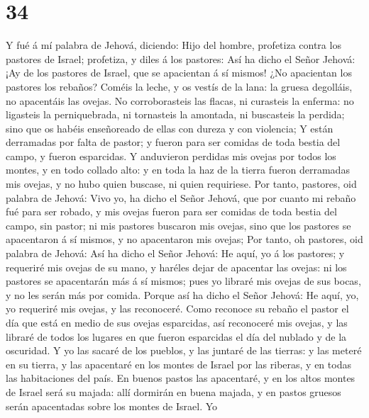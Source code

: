 \hypertarget{section-33}{%
\section{34}\label{section-33}}

 Y fué á mí palabra de Jehová, diciendo: 
Hijo del hombre, profetiza contra los pastores de Israel; profetiza, y
diles á los pastores: Así ha dicho el Señor Jehová: ¡Ay de los pastores
de Israel, que se apacientan á sí mismos! ¿No apacientan los pastores
los rebaños?  Coméis la leche, y os vestís de la lana: la
gruesa degolláis, no apacentáis las ovejas.  No
corroborasteis las flacas, ni curasteis la enferma: no ligasteis la
perniquebrada, ni tornasteis la amontada, ni buscasteis la perdida; sino
que os habéis enseñoreado de ellas con dureza y con violencia;
 Y están derramadas por falta de pastor; y fueron para ser
comidas de toda bestia del campo, y fueron esparcidas.  Y
anduvieron perdidas mis ovejas por todos los montes, y en todo collado
alto: y en toda la haz de la tierra fueron derramadas mis ovejas, y no
hubo quien buscase, ni quien requiriese.  Por tanto,
pastores, oid palabra de Jehová:  Vivo yo, ha dicho el
Señor Jehová, que por cuanto mi rebaño fué para ser robado, y mis ovejas
fueron para ser comidas de toda bestia del campo, sin pastor; ni mis
pastores buscaron mis ovejas, sino que los pastores se apacentaron á sí
mismos, y no apacentaron mis ovejas;  Por tanto, oh
pastores, oid palabra de Jehová:  Así ha dicho el Señor
Jehová: He aquí, yo á los pastores; y requeriré mis ovejas de su mano, y
haréles dejar de apacentar las ovejas: ni los pastores se apacentarán
más á sí mismos; pues yo libraré mis ovejas de sus bocas, y no les serán
más por comida.  Porque así ha dicho el Señor Jehová: He
aquí, yo, yo requeriré mis ovejas, y las reconoceré. 
Como reconoce su rebaño el pastor el día que está en medio de sus ovejas
esparcidas, así reconoceré mis ovejas, y las libraré de todos los
lugares en que fueron esparcidas el día del nublado y de la oscuridad.
 Y yo las sacaré de los pueblos, y las juntaré de las
tierras: y las meteré en su tierra, y las apacentaré en los montes de
Israel por las riberas, y en todas las habitaciones del país.
 En buenos pastos las apacentaré, y en los altos montes
de Israel será su majada: allí dormirán en buena majada, y en pastos
gruesos serán apacentadas sobre los montes de Israel.  Yo
